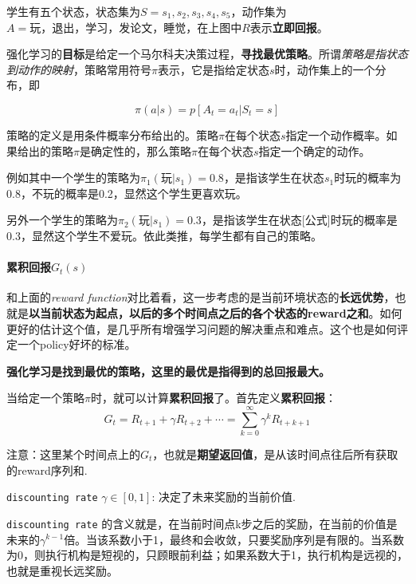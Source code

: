 \documentclass[UTF8,a4paper,12pt]{ctexbook}
\begin{document}
				学生有五个状态，状态集为$S = {s_1, s_2, s_3, s_4, s_5}$，动作集为$A={\textit{玩}，\textit{退出}，\textit{学习}，\textit{发论文}，\textit{睡觉}}$，在上图中$R$表示\textbf{立即回报}。
				
				强化学习的\textbf{目标}是给定一个马尔科夫决策过程，\textbf{寻找最优策略}。所谓\textit{策略是指状态到动作的映射}，策略常用符号$\pi$表示，它是指给定状态$s$时，动作集上的一个分布，即
				
				\begin{equation}
					\pi(a|s) = p[A_t = a_t | S_t = s]
				\end{equation}
				
				策略的定义是用条件概率分布给出的。策略$\pi$在每个状态$s$指定一个动作概率。如果给出的策略$\pi$是确定性的，那么策略$\pi$在每个状态$s$指定一个确定的动作。
				
				例如其中一个学生的策略为$\pi_1(\textit{玩}|s_1) = 0.8$，是指该学生在状态$s_1$时玩的概率为0.8，不玩的概率是0.2，显然这个学生更喜欢玩。
				
				另外一个学生的策略为$\pi_2(\textit{玩}|s_1) = 0.3$，是指该学生在状态[公式]时玩的概率是0.3，显然这个学生不爱玩。依此类推，每学生都有自己的策略。
			
			\paragraph{累积回报$G_t(s)$}	
				和上面的\textit{reward function}对比着看，这一步考虑的是当前环境状态的\textbf{长远优势}，也就是\textbf{以当前状态为起点，以后的多个时间点之后的各个状态的reward之和}。如何更好的估计这个值，是几乎所有增强学习问题的解决重点和难点。这个也是如何评定一个policy好坏的标准。
			
				\textbf{强化学习是找到最优的策略，这里的最优是指得到的总回报最大。}
				
				当给定一个策略$\pi$时，就可以计算\textbf{累积回报}了。首先定义\textbf{累积回报}：
				\begin{equation}
					G_t = R_{t+1} + \gamma R_{t+2} + \cdots = \sum_{k=0}^\infty \gamma^k R_{t+k+1}
				\end{equation}
				
				注意：这里某个时间点上的$G_t$，也就是\textbf{期望返回值}，是从该时间点往后所有获取的reward序列和.
				
				\verb|discounting rate| $\gamma \in [0,1]$: 决定了未来奖励的当前价值.
				
				\verb|discounting rate| 的含义就是，在当前时间点k步之后的奖励，在当前的价值是未来的$\gamma^{k-1}$倍。当该系数小于1，最终和会收敛，只要奖励序列是有限的。当系数为0，则执行机构是短视的，只顾眼前利益；如果系数大于1，执行机构是远视的，也就是重视长远奖励。
				
\end{document}

